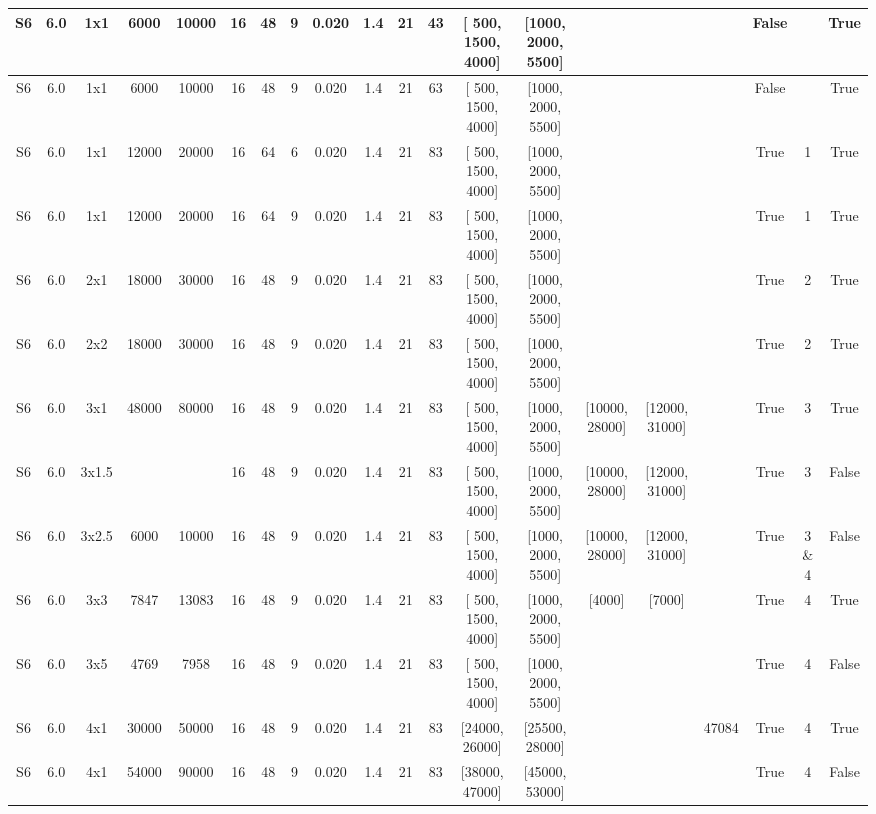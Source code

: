 \begin{table}[!ht]
\begin{tabular}{|c|c|c|c|c|c|c|c|c|c|c|c|c|c|c|c|c|c|c|c|}
        S6 & 6.0 & 1x1 & 6000 & 10000 & 16 & 48 & 9 & 0.020 & 1.4 & 21 & 43 & [ 500, 1500, 4000] & [1000, 2000, 5500] & ~ & ~ & ~ & False & ~ & True \\ \hline
        S6 & 6.0 & 1x1 & 6000 & 10000 & 16 & 48 & 9 & 0.020 & 1.4 & 21 & 63 & [ 500, 1500, 4000] & [1000, 2000, 5500] & ~ & ~ & ~ & False & ~ & True \\ \hline
        S6 & 6.0 & 1x1 & 12000 & 20000 & 16 & 64 & 6 & 0.020 & 1.4 & 21 & 83 & [ 500, 1500, 4000] & [1000, 2000, 5500] & ~ & ~ & ~ & True & 1 & True \\ \hline
        S6 & 6.0 & 1x1 & 12000 & 20000 & 16 & 64 & 9 & 0.020 & 1.4 & 21 & 83 & [ 500, 1500, 4000] & [1000, 2000, 5500] & ~ & ~ & ~ & True & 1 & True \\ \hline
        S6 & 6.0 & 2x1 & 18000 & 30000 & 16 & 48 & 9 & 0.020 & 1.4 & 21 & 83 & [ 500, 1500, 4000] & [1000, 2000, 5500] & ~ & ~ & ~ & True & 2 & True \\ \hline
        S6 & 6.0 & 2x2 & 18000 & 30000 & 16 & 48 & 9 & 0.020 & 1.4 & 21 & 83 & [ 500, 1500, 4000] & [1000, 2000, 5500] & ~ & ~ & ~ & True & 2 & True \\ \hline
        S6 & 6.0 & 3x1 & 48000 & 80000 & 16 & 48 & 9 & 0.020 & 1.4 & 21 & 83 & [ 500, 1500, 4000] & [1000, 2000, 5500] & [10000, 28000] & [12000, 31000] & ~ & True & 3 & True \\ \hline
        S6 & 6.0 & 3x1.5 & ~ & ~ & 16 & 48 & 9 & 0.020 & 1.4 & 21 & 83 & [ 500, 1500, 4000] & [1000, 2000, 5500] & [10000, 28000] & [12000, 31000] & ~ & True & 3 & False \\ \hline
        S6 & 6.0 & 3x2.5 & 6000 & 10000 & 16 & 48 & 9 & 0.020 & 1.4 & 21 & 83 & [ 500, 1500, 4000] & [1000, 2000, 5500] & [10000, 28000] & [12000, 31000] & ~ & True & 3 \& 4 & False \\ \hline
        S6 & 6.0 & 3x3 & 7847 & 13083 & 16 & 48 & 9 & 0.020 & 1.4 & 21 & 83 & [ 500, 1500, 4000] & [1000, 2000, 5500] & [4000] & [7000] & ~ & True & 4 & True \\ \hline
        S6 & 6.0 & 3x5 & 4769 & 7958 & 16 & 48 & 9 & 0.020 & 1.4 & 21 & 83 & [ 500, 1500, 4000] & [1000, 2000, 5500] & ~ & ~ & ~ & True & 4 & False \\ \hline
        S6 & 6.0 & 4x1 & 30000 & 50000 & 16 & 48 & 9 & 0.020 & 1.4 & 21 & 83 & [24000, 26000] & [25500, 28000] & ~ & ~ & 47084 & True & 4 & True \\ \hline
        S6 & 6.0 & 4x1 & 54000 & 90000 & 16 & 48 & 9 & 0.020 & 1.4 & 21 & 83 & [38000, 47000] & [45000, 53000] & ~ & ~ & ~ & True & 4 & False \\ \hline

\end{tabular}
\end{table}
